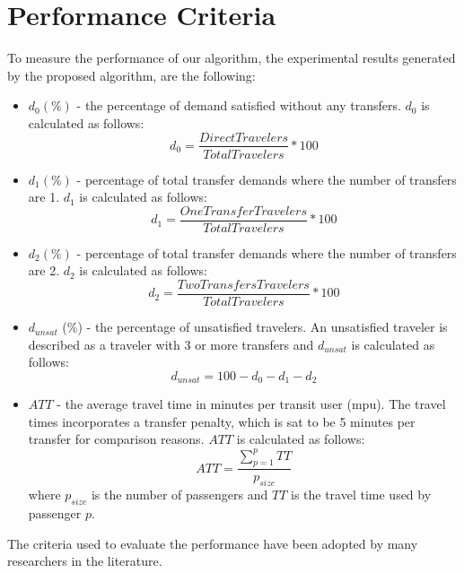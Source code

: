 \section{Performance Criteria}
\label{sec:performanceCriteria}
To measure the performance of our algorithm, the experimental results generated by the proposed algorithm, are the following:

\begin{itemize}
\item $d_0 (\%)$ - the percentage of demand satisfied without any transfers. $d_0$ is calculated as follows:
$$ d_0 = \frac{DirectTravelers}{TotalTravelers}*100$$
\item $d_1 (\%)$ - percentage of total transfer demands where the number of transfers are 1. $d_1$ is calculated as follows:
$$ d_1 = \frac{OneTransferTravelers}{TotalTravelers}*100$$
\item $d_2 (\%)$ - percentage of total transfer demands where the number of transfers are 2. $d_2$ is calculated as follows:
$$ d_2 = \frac{TwoTransfersTravelers}{TotalTravelers}*100$$
\item $d_{unsat}$ (\%) - the percentage of unsatisfied travelers. An unsatisfied traveler is described as a traveler with 3 or more transfers and $d_{unsat}$ is calculated as follows:
$$ d_{unsat} = 100 - d_0 - d_1 - d_2$$
\item $ATT$  - the average travel time in minutes per transit user (mpu). The travel times incorporates a transfer penalty, which is sat to be 5 minutes per transfer for comparison reasons. $ATT$ is calculated as follows:
$$ATT = \frac{\sum\limits^{p}_{p=1}TT}{p_{size}}$$
where $p_{size}$ is the number of passengers and $TT$ is the travel time used by passenger $p$. 
\end{itemize}

The criteria used to evaluate the performance have been adopted by many researchers in the literature.